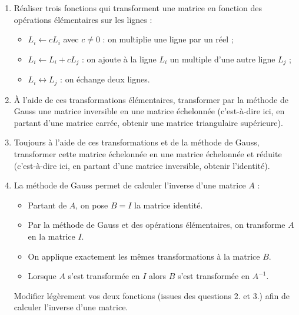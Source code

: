 \documentclass[class=report,crop=false]{standalone}
\begin{document}
\begin{tp}
\sauteligne
\begin{enumerate}
  \item Réaliser trois fonctions qui transforment une matrice en fonction des 
  opérations élémentaires sur les lignes :
  \begin{itemize}
    \item $L_i \leftarrow c L_i$ avec $c \neq 0$ :
  on multiplie une ligne par un réel ;

    \item $L_i \leftarrow L_i+ c L_j$ :
  on ajoute à la ligne $L_i$ un multiple d'une autre ligne $L_j$ ;

    \item $L_i \leftrightarrow L_j$ : on échange deux lignes.
  \end{itemize}

  \item À l'aide de ces transformations élémentaires, transformer par la méthode de Gauss
  une matrice inversible en une matrice échelonnée (c'est-à-dire ici, en partant d'une matrice carrée,
  obtenir une matrice triangulaire supérieure).
  
  \item Toujours à l'aide de ces transformations et de la méthode de Gauss, transformer 
  cette matrice échelonnée en une matrice échelonnée et réduite
  (c'est-à-dire ici, en partant d'une matrice inversible, obtenir l'identité).
  
  \item La méthode de Gauss permet de calculer l'inverse d'une matrice $A$ :
  \begin{itemize}
    \item Partant de $A$, on pose $B = I$ la matrice identité.
    \item Par la méthode de Gauss et des opérations élémentaires,
 on transforme $A$ en 
    la matrice $I$. 
    \item On applique exactement les mêmes transformations à la matrice $B$.
    \item Lorsque $A$ s'est transformée en $I$ alors $B$ s'est transformée en $A^{-1}$.
  \end{itemize}
  Modifier légèrement vos deux fonctions (issues des questions 2. et 3.) afin 
  de calculer l'inverse d'une matrice.
\end{enumerate}
\end{tp}
\end{document}
